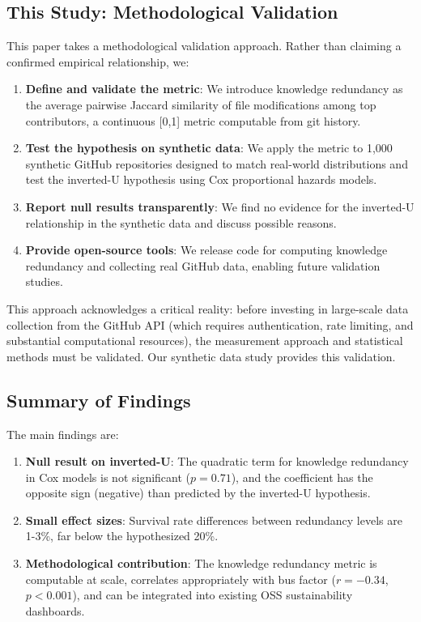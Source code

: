 \documentclass[11pt,letterpaper]{article}
\begin{document}
\subsection{This Study: Methodological Validation}

This paper takes a methodological validation approach. Rather than claiming a confirmed empirical relationship, we:

\begin{enumerate}
    \item \textbf{Define and validate the metric}: We introduce knowledge redundancy as the average pairwise Jaccard similarity of file modifications among top contributors, a continuous [0,1] metric computable from git history.
    
    \item \textbf{Test the hypothesis on synthetic data}: We apply the metric to 1,000 synthetic GitHub repositories designed to match real-world distributions and test the inverted-U hypothesis using Cox proportional hazards models.
    
    \item \textbf{Report null results transparently}: We find no evidence for the inverted-U relationship in the synthetic data and discuss possible reasons.
    
    \item \textbf{Provide open-source tools}: We release code for computing knowledge redundancy and collecting real GitHub data, enabling future validation studies.
\end{enumerate}

This approach acknowledges a critical reality: before investing in large-scale data collection from the GitHub API (which requires authentication, rate limiting, and substantial computational resources), the measurement approach and statistical methods must be validated. Our synthetic data study provides this validation.

\subsection{Summary of Findings}

The main findings are:

\begin{enumerate}
    \item \textbf{Null result on inverted-U}: The quadratic term for knowledge redundancy in Cox models is not significant ($p = 0.71$), and the coefficient has the opposite sign (negative) than predicted by the inverted-U hypothesis.
    
    \item \textbf{Small effect sizes}: Survival rate differences between redundancy levels are 1-3\%, far below the hypothesized 20\%.
    
    \item \textbf{Methodological contribution}: The knowledge redundancy metric is computable at scale, correlates appropriately with bus factor ($r = -0.34$, $p < 0.001$), and can be integrated into existing OSS sustainability dashboards.
\end{enumerate}
\end{document}
